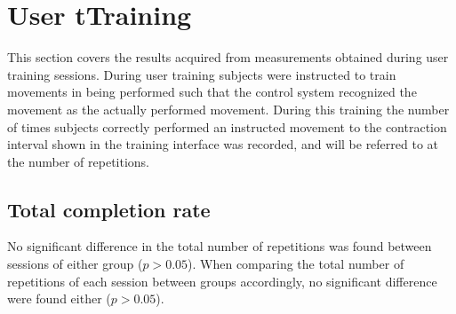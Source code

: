 
\section{User tTraining} \label{sec:R:userTraining}
This section covers the results acquired from measurements obtained during user training sessions. During user training subjects were instructed to train movements in being performed such that the control system recognized the movement as the actually performed movement. During this training the number of times subjects correctly performed an instructed movement to the contraction interval shown in the training interface was recorded, and will be referred to at the number of repetitions.

\subsection{Total completion rate}
No significant difference in the total number of repetitions was found between sessions of either group ($p > 0.05$). When comparing the total number of repetitions of each session between groups accordingly, no significant difference were found either ($p > 0.05$).
%

